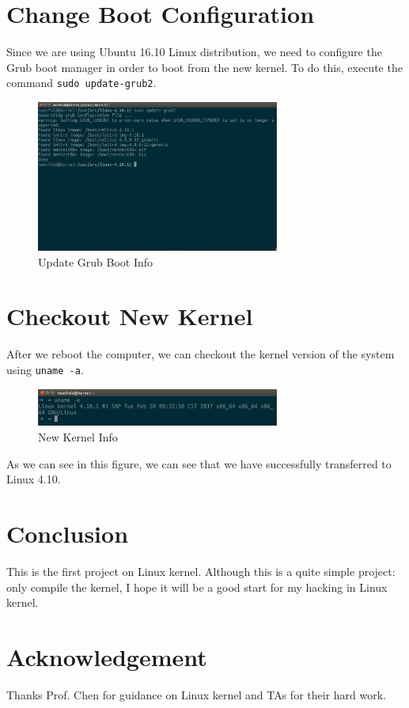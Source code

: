 \documentclass{article}
\begin{document}
\section{Change Boot Configuration}
Since we are using Ubuntu 16.10 Linux distribution, we need to configure the Grub boot manager in order to boot from the new kernel. To do this, execute the command \texttt{sudo update-grub2}.
\begin{figure}[H]
\centering
\includegraphics[width=8cm]{grub.png}
\caption{Update Grub Boot Info}
\end{figure}

\section{Checkout New Kernel}
After we reboot the computer, we can checkout the kernel version of the system using \texttt{uname -a}.
\begin{figure}[H]
\centering
\includegraphics[width=8cm]{uname.png}
\caption{New Kernel Info}
\end{figure}
As we can see in this figure, we can see that we have successfully transferred to Linux 4.10.

\section{Conclusion}
This is the first project on Linux kernel. Although this is a quite simple project: only compile the kernel, I hope it will be a good start for my hacking in Linux kernel.


\section*{Acknowledgement}
Thanks Prof. Chen for guidance on Linux kernel and TAs for their hard work.
\end{document}
